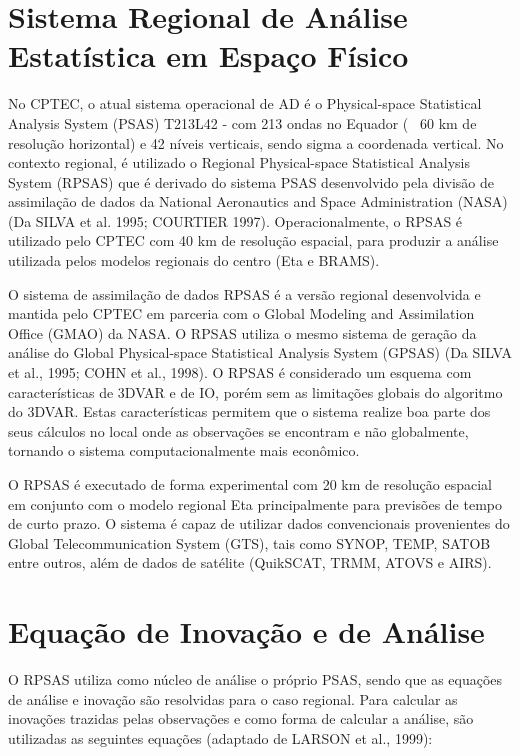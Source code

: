 \section{Sistema Regional de Análise Estatística em Espaço Físico}
\label{ss:rpsas}

No CPTEC, o atual sistema operacional de AD é o Physical-space Statistical Analysis System (PSAS) T213L42 - com 213 ondas no Equador (~ 60 km de resolução horizontal) e 42 níveis verticais, sendo sigma a coordenada vertical. No contexto regional, é utilizado o Regional Physical-space Statistical Analysis System (RPSAS) que é derivado do sistema PSAS desenvolvido pela divisão de assimilação de dados da National Aeronautics and Space Administration (NASA) (Da SILVA et al. 1995; COURTIER 1997). Operacionalmente, o RPSAS é utilizado pelo CPTEC com 40 km de resolução espacial, para produzir a análise utilizada pelos modelos regionais do centro (Eta e BRAMS).

O sistema de assimilação de dados RPSAS é a versão regional desenvolvida e mantida pelo CPTEC em parceria com o Global Modeling and Assimilation Office (GMAO) da NASA. O RPSAS utiliza o mesmo sistema de geração da análise do Global Physical-space Statistical Analysis System (GPSAS) (Da SILVA et al., 1995; COHN et al., 1998). O RPSAS é considerado um esquema com características de 3DVAR e de IO, porém sem as limitações globais do algoritmo do 3DVAR. Estas características permitem que o sistema realize boa parte dos seus cálculos no local onde as observações se encontram e não globalmente, tornando o sistema computacionalmente mais econômico. 

O RPSAS é executado de forma experimental com 20 km de resolução espacial em conjunto com o modelo regional Eta principalmente para previsões de tempo de curto prazo. O sistema é capaz de utilizar dados convencionais provenientes do Global Telecommunication System (GTS), tais como SYNOP, TEMP, SATOB entre outros, além de dados de satélite (QuikSCAT, TRMM, ATOVS e AIRS).

\section{Equação de Inovação e de Análise}
\label{ss:eqinovanl}

O RPSAS utiliza como núcleo de análise o próprio PSAS, sendo que as equações de análise e inovação são resolvidas para o caso regional. Para calcular as inovações trazidas pelas observações e como forma de calcular a análise, são utilizadas as seguintes equações (adaptado de LARSON et al., 1999):

